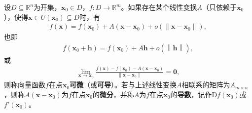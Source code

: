 \documentclass[../../main.tex]{subfiles}%
\begin{document}
\begin{definition}
设$D \subseteq \mathbb{R}^n$为开集，$\bm{x}_0 \in D$，$f: D \to \mathbb{R}^m$。如果存在某个线性变换$A$（只依赖于$\bm{x}_0$），使得$\bm{x} \in U(\bm{x}_0) \subseteq D$时，有
\begin{align*}
f(\bm{x}) = f(\bm{x}_0) + A(\bm{x} - \bm{x}_0) + o\left( \|\bm{x} - \bm{x}_0\| \right),
\end{align*}
也即
\begin{align}\label{eqhsisjiojioewww}
f\left( \boldsymbol{x}_0+\boldsymbol{h} \right) =f\left( \bm{x}_0 \right) +A\boldsymbol{h}+o\left( \left\| \boldsymbol{h} \right\| \right) ,
\end{align}
或
\begin{align*}
\lim\limits_{\bm{x} \to \bm{x}_0} \frac{f(\bm{x}) - f(\bm{x}_0) - A(\bm{x} - \bm{x}_0)}{\|\bm{x} - \bm{x}_0\|} = \bm{0},
\end{align*}
则称向量函数$f$在点$\bm{x}_0$\textbf{可微}（或\textbf{可导}）。若与上述线性变换$A$相联系的矩阵为$A_{m \times n}$，则称$A(\bm{x} - \bm{x}_0)$为$f$在点$\bm{x}_0$的\textbf{微分}，并称$A$为$f$在点$\bm{x}_0$的\textbf{导数}，记作$\mathrm{D}f(\bm{x}_0)$或$f'(\bm{x}_0)$。
\end{definition}
\end{document}
